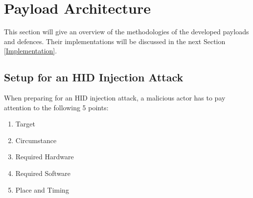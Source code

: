 \newpage
\section{Payload Architecture}


This section will give an overview of the methodologies of the developed payloads and defences. Their implementations will be discussed in the next Section \ref{Implementation}. \\


\subsection{Setup for an HID Injection Attack}

When preparing for an HID injection attack, a malicious actor has to pay attention to the following 5 points:

\begin{enumerate}
    \item Target
    \item Circumstance
    \item Required Hardware
    \item Required Software
    \item Place and Timing
\end{enumerate}


